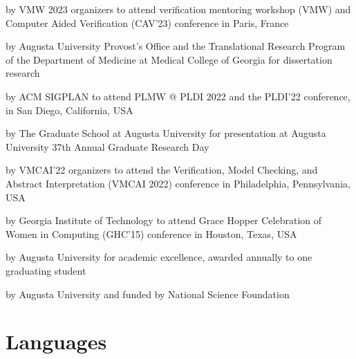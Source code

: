 \documentclass[10pt,letterpaper,roman]{moderncv}
\begin{document}
{by VMW 2023 organizers}
{to attend verification mentoring workshop (VMW) and Computer Aided Verification (CAV'23) conference in Paris, France}{}{}

{by Augusta University Provost's Office and the Translational Research Program of the Department of Medicine at Medical College of Georgia}
{for dissertation research}{}{}

{by ACM SIGPLAN}
{to attend PLMW @ PLDI 2022 and the PLDI'22 conference, in San Diego, California, USA}{}{}

{by The Graduate School at Augusta University}
{for presentation at Augusta University 37th Annual Graduate Research Day}{}{}

{by VMCAI'22 organizers}
{to attend the Verification, Model Checking, and Abstract Interpretation (VMCAI 2022) conference in Philadelphia, Pennsylvania, USA}{}{}

{by Georgia Institute of Technology}
{to attend Grace Hopper Celebration of Women in Computing (GHC'15) conference in Houston, Texas, USA}{}{}

{by Augusta University}
{for academic excellence, awarded annually to one graduating student}{}{}

{by Augusta University and funded by National Science Foundation}
{}{}{}





\section{Languages}
\end{document}
